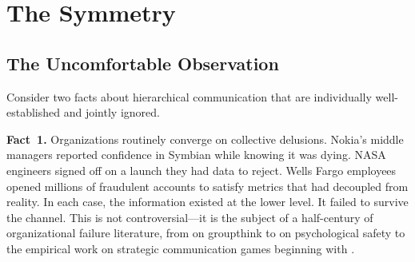 \documentclass[12pt,letterpaper]{article}
\theoremstyle{definition}
\theoremstyle{remark}
\begin{document}
\begin{abstract}
A central corollary: no system can eliminate its capacity for dysfunction without simultaneously eliminating its capacity for creativity. They share a root cause---the generative residual of lossy reconstruction. The design problem is not elimination but channeling: structuring the selection environment to reward divergent reconstruction over convergent drift.

The framework closes the descriptive-to-prescriptive gap in the noise-benefit literature. The five conditions are checkable properties of specific systems, answering the operational question: \emph{will noise help this system, at this operating point, with this integration function?}

\medskip
\noindent\textbf{Keywords:} stochastic resonance, Crawford--Sobel, lossy compression, organizational dysfunction, creativity, level-crossing, information theory, generative noise
\end{abstract}

\newpage

\section{The Symmetry}

\subsection{The Uncomfortable Observation}

Consider two facts about hierarchical communication that are individually well-established and jointly ignored.

\textbf{Fact~1.} Organizations routinely converge on collective delusions. Nokia's middle managers reported confidence in Symbian while knowing it was dying. NASA engineers signed off on a launch they had data to reject. Wells Fargo employees opened millions of fraudulent accounts to satisfy metrics that had decoupled from reality. In each case, the information existed at the lower level. It failed to survive the channel. This is not controversial---it is the subject of a half-century of organizational failure literature, from \citet{janis1972} on groupthink to \citet{edmondson1999} on psychological safety to the empirical work on strategic communication games beginning with \citet{crawford1982}.
\end{document}
